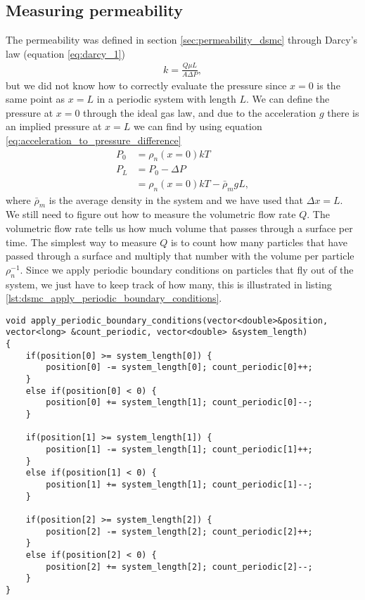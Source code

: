 \subsection{Measuring permeability}
\label{sec:permeability_acceleration_driven}
The permeability was defined in section \ref{sec:permeability_dsmc} through Darcy's law (equation \eqref{eq:darcy_1})
\begin{align}
	k = \frac{Q\mu L}{A \Delta P},
\end{align}
but we did not know how to correctly evaluate the pressure since $x=0$ is the same point as $x=L$ in a periodic system with length $L$. We can define the pressure at $x=0$ through the ideal gas law, and due to the acceleration $g$ there is an implied pressure at $x=L$ we can find by using equation \eqref{eq:acceleration_to_pressure_difference}
\begin{align}
	P_0 &= \rho_n(x=0)kT\\
	P_L &= P_0 - \Delta P \\
	&= \rho_n(x=0)kT - \bar{\rho}_m g L,
\end{align}
where $\bar{\rho}_m$ is the average density in the system and we have used that $\Delta x=L$.\\
We still need to figure out how to measure the volumetric flow rate $Q$. The volumetric flow rate tells us how much volume that passes through a surface per time. The simplest way to measure $Q$ is to count how many particles that have passed through a surface and multiply that number with the volume per particle $\rho_n^{-1}$. Since we apply periodic boundary conditions on particles that fly out of the system, we just have to keep track of how many, this is illustrated in listing \ref{lst:dsmc_apply_periodic_boundary_conditions}.
\begin{lstlisting}[caption=Example of how to apply periodic boundary conditions and at the same time calculate number flux., label=lst:dsmc_apply_periodic_boundary_conditions]
void apply_periodic_boundary_conditions(vector<double>&position, vector<long> &count_periodic, vector<double> &system_length)
{
    if(position[0] >= system_length[0]) { 
    	position[0] -= system_length[0]; count_periodic[0]++; 
    }
    else if(position[0] < 0) { 
    	position[0] += system_length[1]; count_periodic[0]--; 
    }

    if(position[1] >= system_length[1]) { 
    	position[1] -= system_length[1]; count_periodic[1]++;
    }
    else if(position[1] < 0) {
    	position[1] += system_length[1]; count_periodic[1]--; 
    }

    if(position[2] >= system_length[2]) { 
    	position[2] -= system_length[2]; count_periodic[2]++; 
    }
    else if(position[2] < 0) {
    	position[2] += system_length[2]; count_periodic[2]--; 
    }
}
\end{lstlisting}
